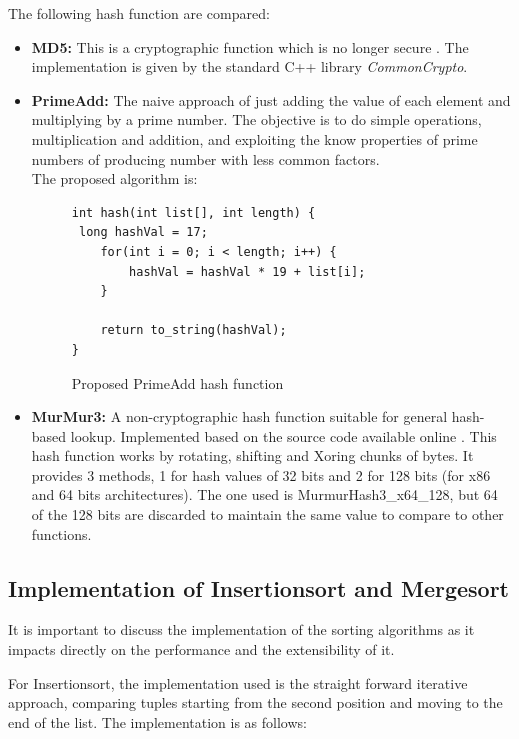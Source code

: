 \documentclass[a4paper,12pt]{article}
\begin{document}
The following hash function are compared:

\begin{itemize}

\item {\bf MD5:} This is a cryptographic function \cite{rivest1992md5} which is no longer secure \cite{wang2005break}.  The implementation is given by the standard C++ library {\it CommonCrypto}.

\item {\bf PrimeAdd:} The naive approach of just adding the value of each element and multiplying by a prime number. The objective is to do simple operations, multiplication and addition, and exploiting the know properties of prime numbers of producing number with less common factors. \\ 
The proposed algorithm is:

\begin{figure}[H]
\begin{verbatim}
int hash(int list[], int length) {
 long hashVal = 17;
    for(int i = 0; i < length; i++) {
        hashVal = hashVal * 19 + list[i];
    }

    return to_string(hashVal);
}
\end{verbatim}
\caption{Proposed PrimeAdd hash function}
\end{figure}
 

\item {\bf MurMur3:} A non-cryptographic hash function suitable for general hash-based lookup. Implemented based on the source code available online \cite{MurMur3}. This hash function works by rotating, shifting and Xoring chunks of bytes. It provides 3 methods, 1 for hash values of 32 bits and 2 for 128 bits (for x86 and 64 bits architectures). The one used is MurmurHash3\_x64\_128, but 64 of the 128 bits are discarded to maintain the same value to compare to other functions.

\end{itemize}

\subsection{Implementation of Insertionsort and Mergesort} \label{SortingImplementation}
It is important to discuss the implementation of the sorting algorithms as it impacts directly on the performance and the extensibility of it.

For Insertionsort, the implementation used is the straight forward iterative approach, comparing tuples starting from the second position and moving to the end of the list. The implementation is as follows:
\end{document}
